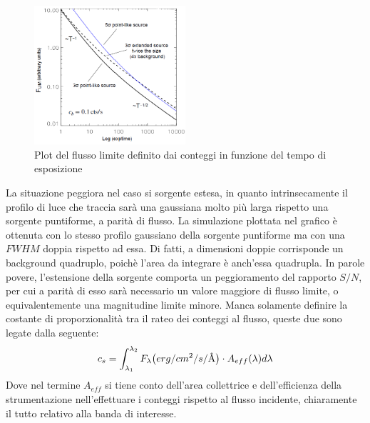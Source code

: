 \begin{figure}[h]
	\centering
	\vspace{-5pt}
	\includegraphics[width=0.5\textwidth]{Immagini/Capitolo2/Flusso_limite_plot_counttime.PNG}
	\caption{Plot del flusso limite definito dai conteggi in funzione del tempo di esposizione}
	\vspace{-5pt}
\end{figure}

La situazione peggiora nel caso si sorgente estesa, in quanto intrinsecamente il profilo di luce che traccia sarà una gaussiana molto più larga rispetto una sorgente puntiforme, a parità di flusso. La simulazione plottata nel grafico è ottenuta con lo stesso profilo gaussiano della sorgente puntiforme ma con una $FWHM$ doppia rispetto ad essa. Di fatti, a dimensioni doppie corrisponde un background quadruplo, poichè l'area da integrare è anch'essa quadrupla. In parole povere, l'estensione della sorgente comporta un peggioramento del rapporto $S/N$, per cui a parità di esso sarà necessario un valore maggiore di flusso limite, o equivalentemente una magnitudine limite minore. Manca solamente definire la costante di proporzionalità tra il rateo dei conteggi al flusso, queste due sono legate dalla seguente:
\begin{equation}
	\label{eq:lim-flux-conteggi}
	c_s = \int_{\lambda_1}^{\lambda_2} F_{\lambda}\bigl( erg/cm^2/s/\mbox{\normalfont\AA} \bigr) \cdot A_{eff}(\lambda) d\lambda
\end{equation}
Dove nel termine $A_{eff}$ si tiene conto dell'area collettrice e dell'efficienza della strumentazione nell'effettuare i conteggi rispetto al flusso incidente, chiaramente il tutto relativo alla banda di interesse.

